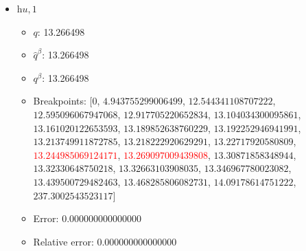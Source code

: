 \documentclass{article}%
\begin{document}
\begin{itemize}
\begin{itemize}
		\item Error: 0.000000000000000%
		\item Relative error: 0.000000000000000%
	\end{itemize}%
	\item $\textit{hu},1$%
	\begin{itemize}%
		\item $q$: 13.266498%
		\item $\hat{q}^\beta$: 13.266498%
		\item $q^\beta$: 13.266498%
		\item Breakpoints: $[$$0$, $4.943755299006499$, $12.544341108707222$, $12.595096067947068$, $12.917705220652834$, $13.104034300095861$, $13.161020122653593$, $13.189852638760229$, $13.192252946941991$, $13.213749911872785$, $13.218222920629291$, $13.22717920580809$, \textcolor{red}{$13.244985069124171$}, \textcolor{red}{$13.269097009439808$}, $13.30871858348944$, $13.32330648750218$, $13.32663103908035$, $13.346967780023082$, $13.439500729482463$, $13.468285806082731$, $14.09178614751222$, $237.3002543523117$$]$%
		\item Error: 0.000000000000000%
		\item Relative error: 0.000000000000000%
	\end{itemize}%
\end{itemize}%
\end{document}
